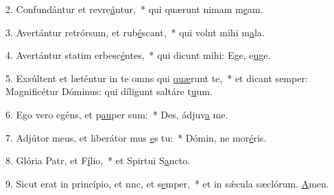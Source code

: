 2. Confundántur et revre\uline{á}ntur,~* qui quærunt nimam m\uline{e}am.\par 
3. Avertántur retrórsum, et rub\uline{é}scant,~* qui volnt mihi m\uline{a}la.\par 
4. Avertántur statim erbesc\uline{é}ntes,~* qui dicunt mihi: Ege, e\uline{u}ge.\par 
5. Exsúltent et læténtur in te omns qui \uline{quæ}runt te,~* et dicant semper: Magnificétur Dóminus: qui díligunt saltáre t\uline{u}um.\par 
6. Ego vero egéns, et p\uline{au}per sum:~* Des, ádjuv\uline{a} me.\par 
7. Adjútor meus, et liberátor mus \uline{e}s tu:~* Dómin, ne mor\uline{é}ris.\par 
8. Glória Patr, et F\uline{í}lio,~* et Spirtui S\uline{a}ncto.\par 
9. Sicut erat in princípio, et nnc, et s\uline{e}mper,~* et in sǽcula sæclórum. \uline{A}men.\par 
